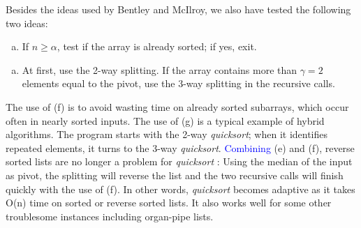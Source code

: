\documentclass[AMA,STIX1COL]{WileyNJD-v2}
\newcommand{\qusort}{\emph{quicksort }}
\newcommand{\qusortn}{\emph{quicksort}}
\newcommand{\qsort}{\emph{qsort }}
\newcommand{\qsortn}{\emph{qsort}}
\begin{document}
Besides the ideas used by Bentley and McIlroy, we also have tested the following two ideas:

\begin{enumerate}[(f)]
\item If $n \geq \alpha$, test if the array is already sorted; if yes, exit.
\end{enumerate}
\begin{enumerate}[(g)]
\item At first, use the 2-way splitting. If the array contains more than $\gamma = 2$ elements equal to the pivot, use the 3-way splitting in the recursive calls.
\end{enumerate}

The use of (f) is to avoid wasting time on already sorted subarrays, which occur often in nearly sorted inputs. 
The use of (g) is a typical example of hybrid algorithms.  
The program starts with the 2-way \qusortn; when it identifies repeated elements, it turns to the 3-way \qusortn. 
 \textcolor{blue}{Combining} (e) and (f), reverse sorted lists are no longer a problem for \qusort: Using the median of the input as pivot, the splitting will reverse the list and the two recursive calls will finish quickly with the use of (f). 
In other words, \qusort becomes adaptive as it takes O(n) time on sorted or reverse sorted lists. 
It also works well for some other troublesome instances including organ-pipe lists.
\end{document}
